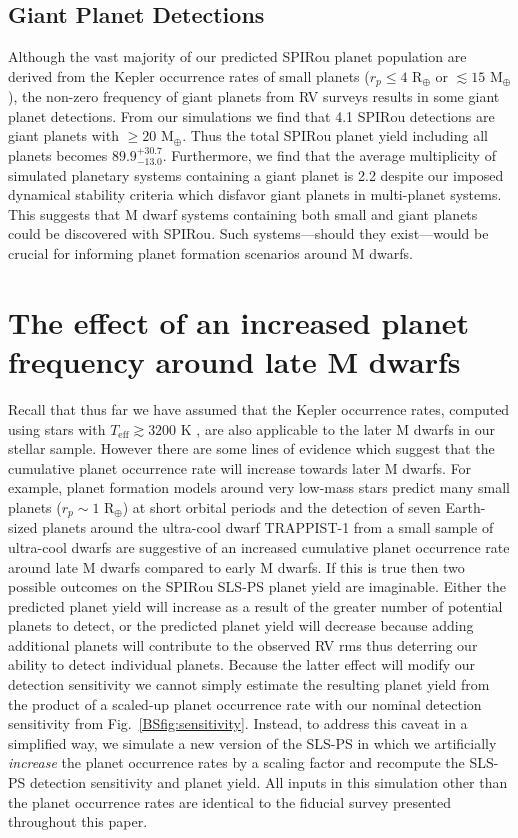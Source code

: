 \subsection{Giant Planet Detections}
Although the vast majority of our predicted SPIRou planet population are derived from the Kepler occurrence
rates of small planets ($r_p \leq 4$ R$_{\oplus}$ or \msini{} $\lesssim 15$ M$_{\oplus}$), the non-zero frequency
of giant planets from RV surveys results in some giant planet detections. From our simulations we find that
4.1 SPIRou detections are giant planets with \msini{} $\geq 20$ M$_{\oplus}$. Thus the total SPIRou planet yield
including all planets becomes $89.9^{+30.7}_{-13.0}$. Furthermore, we find
that the average multiplicity of simulated planetary systems containing a giant planet is 2.2 despite our
imposed dynamical stability criteria which disfavor giant planets in multi-planet systems. This suggests that
M dwarf systems containing both small and giant planets could be discovered with SPIRou. Such systems---should
they exist---would be crucial for informing planet formation scenarios around M dwarfs.


\section{The effect of an increased planet frequency around late M dwarfs} \label{BSsect:2occ}
Recall that thus far we have assumed that the Kepler occurrence rates,
computed using stars with $T_{\text{eff}} \gtrsim 3200$ K \citep[i.e. spectral
  types of M4.5 and earlier;][]{luhman03}, are also applicable to the later
M dwarfs in our stellar sample. However there are some lines of evidence which
suggest that the cumulative planet occurrence rate will increase towards later M dwarfs.
For example, planet formation models around very
low-mass stars predict many small planets ($r_p \sim 1$ R$_{\oplus}$) at short
orbital periods \citep[e.g.][]{alibert13,alibert17} and the detection of seven
Earth-sized planets around the ultra-cool dwarf TRAPPIST-1 from a small sample
of ultra-cool dwarfs \citep{gillon17, luger17} are suggestive of an increased
cumulative planet occurrence rate around late M dwarfs compared to early
M dwarfs. If this is true then two possible outcomes on the SPIRou SLS-PS
planet yield are imaginable. Either the predicted planet yield will increase as a
result of the greater number of potential planets to detect, or the predicted
planet yield will decrease because adding additional planets will contribute to the
observed RV rms thus deterring our ability to detect individual planets.
Because the latter effect will modify our detection sensitivity we cannot simply estimate the
resulting planet yield from the product of a scaled-up planet occurrence rate with our nominal
detection sensitivity from Fig.~\ref{BSfig:sensitivity}. Instead, to address this
caveat in a simplified way, we simulate a new version of the SLS-PS 
in which we artificially \emph{increase} the planet occurrence rates by a scaling factor
and recompute the SLS-PS detection sensitivity and planet yield.
All inputs in this simulation other than the planet occurrence
rates are identical to the fiducial survey presented throughout this paper. 

